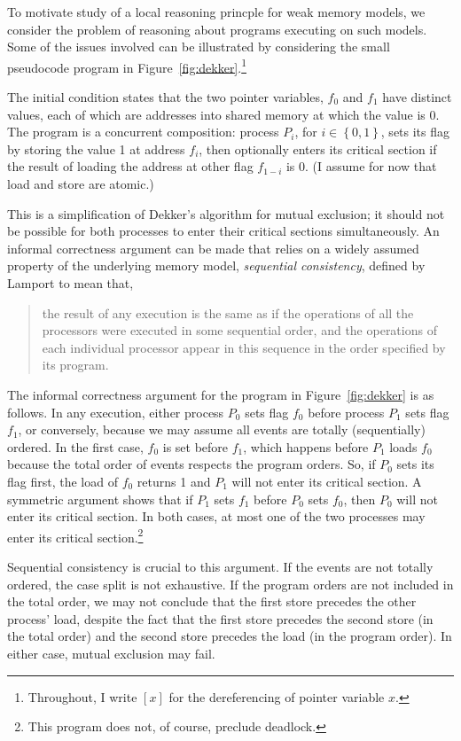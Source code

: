 \documentclass[11pt]{report}
\begin{document}
To motivate study of a local reasoning princple for weak memory models, we consider the problem of reasoning about programs executing on such models. Some of the issues involved can be illustrated by considering the small pseudocode program in Figure~\ref{fig:dekker}.\footnote{Throughout, I write $\left[ x \right]$ for the dereferencing of pointer variable $x$.}

The initial condition states that the two pointer variables, $f_0$ and $f_1$ have distinct values, each of which are addresses into shared memory at which the value is 0. The program is a concurrent composition: process $P_i$, for $i \in \left\lbrace 0,1 \right\rbrace$, sets its flag by storing the value 1 at address $f_i$, then optionally enters its critical section if the result of loading the address at other flag $f_{1-i}$ is 0. (I assume for now that load and store are atomic.)

This is a simplification of Dekker's algorithm for mutual exclusion; it should not be possible for both processes to enter their critical sections simultaneously. An informal correctness argument can be made that relies on a widely assumed property of the underlying memory model, \emph{sequential consistency}, defined by Lamport \cite{DBLP:journals/tc/Lamport79} to mean that, \begin{quotation}\noindent the result of any execution is the same as if the operations of all the processors were executed in some sequential order, and the operations of each individual processor appear in this sequence in the order specified by its program. \end{quotation}

The informal correctness argument for the program in Figure~\ref{fig:dekker} is as follows. In any execution, either process $P_0$ sets flag $f_0$ before process $P_1$ sets flag $f_1$, or conversely, because we may assume all events are totally (sequentially) ordered. In the first case, $f_0$ is set before $f_1$, which happens before $P_1$ loads $f_0$ because the total order of events respects the program orders. So, if $P_0$ sets its flag first, the load of $f_0$ returns 1 and $P_1$ will not enter its critical section. A symmetric argument shows that if $P_1$ sets $f_1$ before $P_0$ sets $f_0$, then $P_0$ will not enter its critical section. In both cases, at most one of the two processes may enter its critical section.\footnote{This program does not, of course, preclude deadlock.}

Sequential consistency is crucial to this argument. If the events are not totally ordered, the case split is not exhaustive. If the program orders are not included in the total order, we may not conclude that the first store precedes the other process' load, despite the fact that the first store precedes the second store (in the total order) and the second store precedes the load (in the program order). In either case, mutual exclusion may fail.
\end{document}
